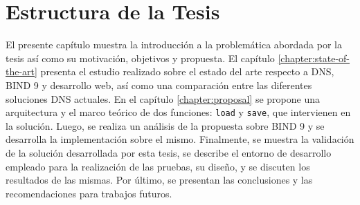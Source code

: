 \section{Estructura de la Tesis}

El presente capítulo muestra la introducción a la problemática abordada
por la tesis así como su motivación, objetivos y propuesta. El capítulo \ref{chapter:state-of-the-art} presenta el estudio realizado sobre el estado del arte respecto a DNS, BIND 9 y desarrollo web, así como una comparación entre las diferentes soluciones DNS actuales. En el capítulo \ref{chapter:proposal} se propone una arquitectura y el marco teórico de dos funciones: \verb|load| y \verb|save|, que intervienen en la solución. Luego, se realiza un análisis de la propuesta sobre BIND 9 y se desarrolla la implementación sobre el mismo. Finalmente, se muestra la validación de la solución desarrollada por esta tesis, se describe el entorno de desarrollo empleado para la realización de las pruebas, su diseño, y se discuten los resultados de las mismas. Por último, se presentan las conclusiones y las recomendaciones para trabajos futuros.